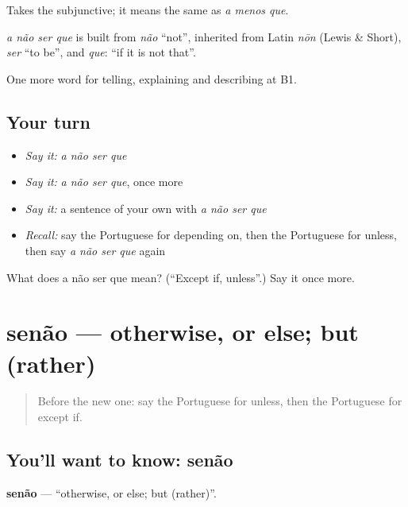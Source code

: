 Takes the subjunctive; it means the same as \emph{a menos que}.

\begin{cousinweb}
\emph{a não ser que} is built from \emph{não} \textquotedblleft{}not\textquotedblright{}, inherited from Latin \emph{nōn} (Lewis \& Short), \emph{ser} \textquotedblleft{}to be\textquotedblright{}, and \emph{que}: \textquotedblleft{}if it is not that\textquotedblright{}.
\end{cousinweb}

\begin{grammarlens}[title={What you've built}]
One more word for telling, explaining and describing at B1.
\end{grammarlens}

\subsection*{Your turn}
\begin{itemize}
\raggedright
  \item \emph{Say it:} \emph{a não ser que}
  \item \emph{Say it:} \emph{a não ser que}, once more
  \item \emph{Say it:} a sentence of your own with \emph{a não ser que}
  \item \emph{Recall:} say the Portuguese for depending on, then the Portuguese for unless, then say \emph{a não ser que} again
\end{itemize}

\begin{tcolorbox}[breakable,colback=teal!4,colframe=teal!35!black,title={Before you move on}]
What does a não ser que mean? (\textquotedblleft{}Except if, unless\textquotedblright{}.) Say it once more.
\end{tcolorbox}
\section[senão]{senão — otherwise, or else; but (rather)}

\label{lesson:PT-C370-senao}



\begin{quote}
Before the new one: say the Portuguese for unless, then the Portuguese for except if.
\end{quote}

\subsection*{You'll want to know: senão}
\textbf{senão} — \textquotedblleft{}otherwise, or else; but (rather)\textquotedblright{}.

